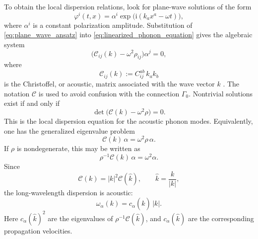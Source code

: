 \documentclass[11pt]{amsart}
\theoremstyle{plain}
\theoremstyle{definition}
\theoremstyle{remark}
\begin{document}
\medskip

To obtain the local dispersion relations, look for plane-wave solutions of the form
\begin{equation}
	\varphi^i(t,x)=\alpha^i\exp\!\bigl(\mathrm i(k_ax^a-\omega t)\bigr),
	\label{eq:plane_wave_ansatz}
\end{equation}
where \(\alpha^i\) is a constant polarization amplitude.
Substitution of \eqref{eq:plane_wave_ansatz} into \eqref{eq:linearized_phonon_equation} gives the algebraic system
\begin{equation}
	\bigl(\mathcal C_{ij}(k)-\omega^2\rho_{ij}\bigr)\alpha^j=0,
	\label{eq:christoffel_equation}
\end{equation}
where
\begin{equation}
	\mathcal C_{ij}(k):=C^{ab}_{ij}\,k_ak_b
	\label{eq:christoffel_matrix}
\end{equation}
is the Christoffel, or acoustic, matrix associated with the wave vector \(k\) \cite{NyePhysicalProperties,MusgraveCrystalAcoustics}.
The notation \(\mathcal C\) is used to avoid confusion with the connection \(\Gamma_0\).
Nontrivial solutions exist if and only if
\begin{equation}
	\det\bigl(\mathcal C(k)-\omega^2\rho\bigr)=0.
	\label{eq:dispersion_relation_general}
\end{equation}
This is the local dispersion equation for the acoustic phonon modes. 
Equivalently, one has the generalized eigenvalue problem
\begin{equation}
	\mathcal C(k)\,\alpha=\omega^2\rho\,\alpha.
	\label{eq:eigenvalue_problem_phonons}
\end{equation}
If \(\rho\) is nondegenerate, this may be written as
\[
\rho^{-1}\mathcal C(k)\,\alpha=\omega^2\alpha.
\]
Since
\[
\mathcal C(k)=|k|^2\mathcal C(\hat k),
\qquad
\hat k=\frac{k}{|k|},
\]
the long-wavelength dispersion is acoustic:
\begin{equation}
	\omega_\alpha(k)=c_\alpha(\hat k)\,|k|.
	\label{eq:acoustic_dispersion}
\end{equation}
Here \(c_\alpha(\hat k)^2\) are the eigenvalues of \(\rho^{-1}\mathcal C(\hat k)\), and \(c_\alpha(\hat k)\) are the corresponding propagation velocities.

\medskip
\end{document}
